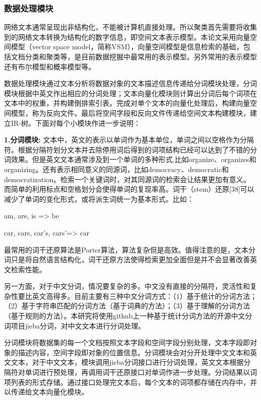 \subsubsection{数据处理模块}

网络文本通常呈现出非结构化，不能被计算机直接处理。所以聚类首先需要将收集到的网络文本转换为结构化的数字信息，即空间文本表示模型。本论文采用向量空间模型（vector space model，简称VSM），向量空间模型是信息检索的基础，包括文档分类和聚类等，是目前数据挖掘中最常用的表示模型。另外常用的表示模型还有布尔模型和概率模型等。

数据处理模块通过文本分析将数据对象的文本描述信息传递给分词模块处理，分词模块根据中英文作出相应的分词处理；文本向量化模块则计算出分词后每个词项在文本中的权重，并构建倒排索引表。完成对单个文本的向量化处理后，构建向量空间模型，称为反向文件。最后将空间字段和反向文件传递给空间文本构建模块，建立IR-树。下面对每个小模块作进一步说明：

\textbf{1.分词模块:} 文本中，英文的表示以单词作为基本单位，单词之间以空格作为分隔符。根据分隔符划分文本并去除停用词后得到的词项结构已经可以达到了不错的分词效果。但是英文文本通常涉及到一个单词的多种形式,比如organize、organizes和organizing。还有表示相同意义的同源词，比如democracy、democratic和democratization。检索一个关键词时，对其同源词的检索会让结果更加有意义。而简单的利用标点和空格划分会使得单词的复现率高。词干（stem）还原[38]可以减少了单词的变化形式，或将派生词统一为基本形式。比如：

am, are, is => be

car, cars, car’s, cars’=> car

最常用的词干还原算法是Porter算法，算法复杂但是高效。值得注意的是，文本分词只是将自然语言结构化，词干还原方法使得检索更加全面但是并不会显著改善英文检索性能。

另一方面，对于中文分词，情况要复杂的多。中文没有直接的分隔符，灵活性和复杂性要比英文高得多。目前主要有三种中文分词方式：（1）基于统计的分词方法；（2）基于字符串匹配的分词方法（基于词典的方法）；（3）基于理解的分词方法（基于规则的方法）。本研究将使用github上一种基于统计分词方法的开源中文分词项目jieba分词，对中文文本进行分词处理。 

分词模块将数据集的每一个文档按照文本字段和空间字段分别处理，文本字段即对象的描述内容，空间字段即对象的位置信息。分词模块会对分开处理中文文本和英文文本，对于中文文本，模块调用jieba分词接口进行分词处理，英文文本根据分隔符对单词进行预处理，再调用词干还原接口对单词作进一步处理。分词结果以词项列表的形式存储。通过接口处理完文本后，每个文本的词项都存储在内存中，并以传递给文本向量化模块。

